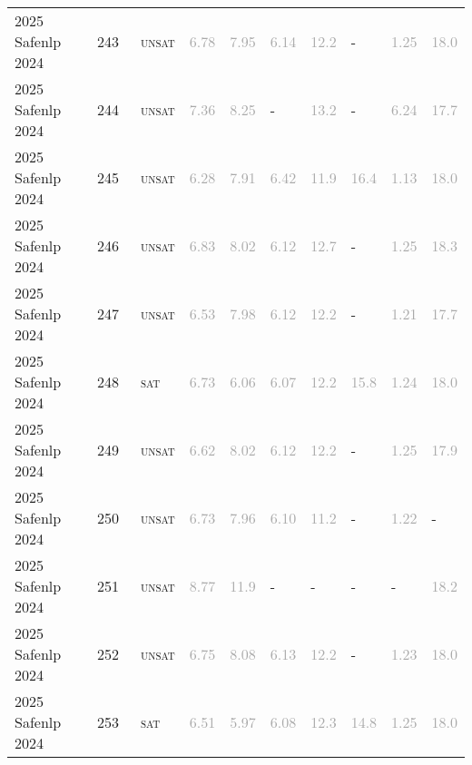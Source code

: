 \begin{center}
{\begin{longtable}{@{}llllllllll@{}}
2025 Safenlp 2024 & 243 & ~\textsc{unsat} & \textcolor{darkgray}{6.78} & \textcolor{darkgray}{7.95} & \textcolor{darkgray}{6.14} & \textcolor{darkgray}{12.2} & - & \textcolor{darkgray}{1.25} & \textcolor{darkgray}{18.0} \\
2025 Safenlp 2024 & 244 & ~\textsc{unsat} & \textcolor{darkgray}{7.36} & \textcolor{darkgray}{8.25} & - & \textcolor{darkgray}{13.2} & - & \textcolor{darkgray}{6.24} & \textcolor{darkgray}{17.7} \\
2025 Safenlp 2024 & 245 & ~\textsc{unsat} & \textcolor{darkgray}{6.28} & \textcolor{darkgray}{7.91} & \textcolor{darkgray}{6.42} & \textcolor{darkgray}{11.9} & \textcolor{darkgray}{16.4} & \textcolor{darkgray}{1.13} & \textcolor{darkgray}{18.0} \\
2025 Safenlp 2024 & 246 & ~\textsc{unsat} & \textcolor{darkgray}{6.83} & \textcolor{darkgray}{8.02} & \textcolor{darkgray}{6.12} & \textcolor{darkgray}{12.7} & - & \textcolor{darkgray}{1.25} & \textcolor{darkgray}{18.3} \\
2025 Safenlp 2024 & 247 & ~\textsc{unsat} & \textcolor{darkgray}{6.53} & \textcolor{darkgray}{7.98} & \textcolor{darkgray}{6.12} & \textcolor{darkgray}{12.2} & - & \textcolor{darkgray}{1.21} & \textcolor{darkgray}{17.7} \\
2025 Safenlp 2024 & 248 & ~\textsc{sat} & \textcolor{darkgray}{6.73} & \textcolor{darkgray}{6.06} & \textcolor{darkgray}{6.07} & \textcolor{darkgray}{12.2} & \textcolor{darkgray}{15.8} & \textcolor{darkgray}{1.24} & \textcolor{darkgray}{18.0} \\
2025 Safenlp 2024 & 249 & ~\textsc{unsat} & \textcolor{darkgray}{6.62} & \textcolor{darkgray}{8.02} & \textcolor{darkgray}{6.12} & \textcolor{darkgray}{12.2} & - & \textcolor{darkgray}{1.25} & \textcolor{darkgray}{17.9} \\
2025 Safenlp 2024 & 250 & ~\textsc{unsat} & \textcolor{darkgray}{6.73} & \textcolor{darkgray}{7.96} & \textcolor{darkgray}{6.10} & \textcolor{darkgray}{11.2} & - & \textcolor{darkgray}{1.22} & - \\
2025 Safenlp 2024 & 251 & ~\textsc{unsat} & \textcolor{darkgray}{8.77} & \textcolor{darkgray}{11.9} & - & - & - & - & \textcolor{darkgray}{18.2} \\
2025 Safenlp 2024 & 252 & ~\textsc{unsat} & \textcolor{darkgray}{6.75} & \textcolor{darkgray}{8.08} & \textcolor{darkgray}{6.13} & \textcolor{darkgray}{12.2} & - & \textcolor{darkgray}{1.23} & \textcolor{darkgray}{18.0} \\
2025 Safenlp 2024 & 253 & ~\textsc{sat} & \textcolor{darkgray}{6.51} & \textcolor{darkgray}{5.97} & \textcolor{darkgray}{6.08} & \textcolor{darkgray}{12.3} & \textcolor{darkgray}{14.8} & \textcolor{darkgray}{1.25} & \textcolor{darkgray}{18.0} \\

\end{longtable}}
\end{center}
